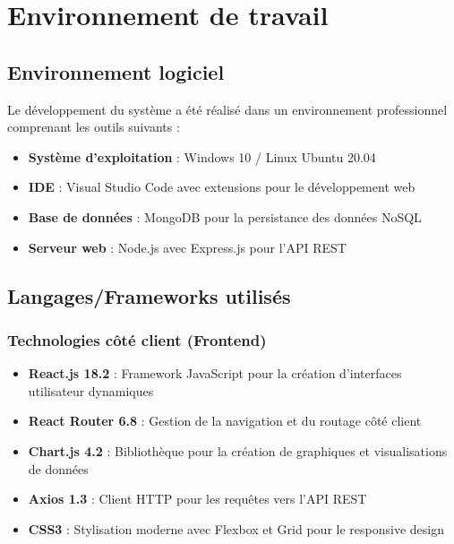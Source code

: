 \documentclass[12pt,a4paper]{report}
\begin{document}
\section{Environnement de travail}

\subsection{Environnement logiciel}

Le développement du système a été réalisé dans un environnement professionnel comprenant les outils suivants :

\begin{itemize}
    \item \textbf{Système d'exploitation} : Windows 10 / Linux Ubuntu 20.04
    \item \textbf{IDE} : Visual Studio Code avec extensions pour le développement web
    \item \textbf{Base de données} : MongoDB pour la persistance des données NoSQL
    \item \textbf{Serveur web} : Node.js avec Express.js pour l'API REST
\end{itemize}

\subsection{Langages/Frameworks utilisés}

\subsubsection{Technologies côté client (Frontend)}
\begin{itemize}
    \item \textbf{React.js 18.2} : Framework JavaScript pour la création d'interfaces utilisateur dynamiques
    \item \textbf{React Router 6.8} : Gestion de la navigation et du routage côté client
    \item \textbf{Chart.js 4.2} : Bibliothèque pour la création de graphiques et visualisations de données
    \item \textbf{Axios 1.3} : Client HTTP pour les requêtes vers l'API REST
    \item \textbf{CSS3} : Stylisation moderne avec Flexbox et Grid pour le responsive design
\end{itemize}
\end{document}
